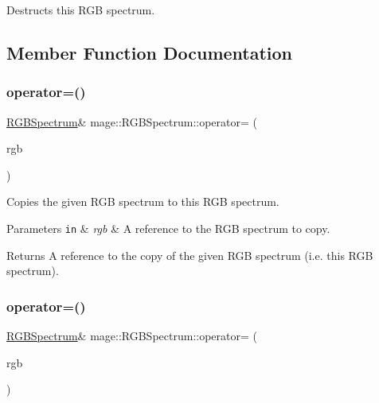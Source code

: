 Destructs this R\+GB spectrum. 

\subsection{Member Function Documentation}
\hypertarget{structmage_1_1_r_g_b_spectrum_ac4701cc62489d27130853c3ba667a767}{}\label{structmage_1_1_r_g_b_spectrum_ac4701cc62489d27130853c3ba667a767} 
\subsubsection{\texorpdfstring{operator=()}{operator=()}\hspace{0.1cm}{\footnotesize\ttfamily [1/2]}}
{\footnotesize\ttfamily \hyperlink{structmage_1_1_r_g_b_spectrum}{R\+G\+B\+Spectrum}\& mage\+::\+R\+G\+B\+Spectrum\+::operator= (\begin{DoxyParamCaption}\item[{const \hyperlink{structmage_1_1_r_g_b_spectrum}{R\+G\+B\+Spectrum} \&}]{rgb }\end{DoxyParamCaption})\hspace{0.3cm}{\ttfamily [default]}}

Copies the given R\+GB spectrum to this R\+GB spectrum.


\begin{DoxyParams}[1]{Parameters}
\mbox{\tt in}  & {\em rgb} & A reference to the R\+GB spectrum to copy. \\
\hline
\end{DoxyParams}
\begin{DoxyReturn}{Returns}
A reference to the copy of the given R\+GB spectrum (i.\+e. this R\+GB spectrum). 
\end{DoxyReturn}
\hypertarget{structmage_1_1_r_g_b_spectrum_a3a487cd0fcb35395c0979552dc551829}{}\label{structmage_1_1_r_g_b_spectrum_a3a487cd0fcb35395c0979552dc551829} 
\subsubsection{\texorpdfstring{operator=()}{operator=()}\hspace{0.1cm}{\footnotesize\ttfamily [2/2]}}
{\footnotesize\ttfamily \hyperlink{structmage_1_1_r_g_b_spectrum}{R\+G\+B\+Spectrum}\& mage\+::\+R\+G\+B\+Spectrum\+::operator= (\begin{DoxyParamCaption}\item[{\hyperlink{structmage_1_1_r_g_b_spectrum}{R\+G\+B\+Spectrum} \&\&}]{rgb }\end{DoxyParamCaption})\hspace{0.3cm}{\ttfamily [default]}}

